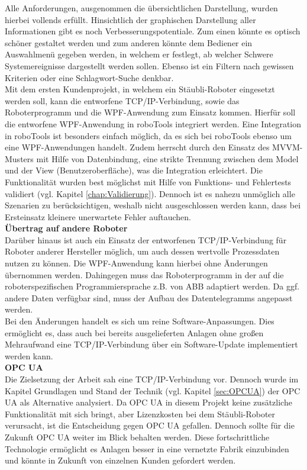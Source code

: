 \documentclass[ a4paper,
                oneside,
                toc=bibliography,
                toc=listof
                ]{scrbook}
\begin{document}
   	\noindent
   	Alle Anforderungen, ausgenommen die übersichtlichen Darstellung, wurden hierbei vollends erfüllt. Hinsichtlich der graphischen Darstellung aller Informationen gibt es noch Verbesserungspotentiale. Zum einen könnte es optisch schöner gestaltet werden und zum anderen könnte dem Bediener ein Auswahlmenü gegeben werden, in welchem er festlegt, ab welcher Schwere Systemereignisse dargestellt werden sollen. Ebenso ist ein Filtern nach gewissen Kriterien oder eine Schlagwort-Suche denkbar.\\
   	Mit dem ersten Kundenprojekt, in welchem ein Stäubli-Roboter eingesetzt werden soll, kann die entworfene TCP/IP-Verbindung, sowie das Roboterprogramm und die WPF-Anwendung zum Einsatz kommen. Hierfür soll die entworfene WPF-Anwendung in roboTools integriert werden. Eine Integration in roboTools ist besonders einfach möglich, da es sich bei roboTools ebenso um eine WPF-Anwendungen handelt. Zudem herrscht durch den Einsatz des MVVM-Musters mit Hilfe von Datenbindung, eine strikte Trennung zwischen dem Model und der View (Benutzeroberfläche), was die Integration erleichtert.
   	Die Funktionalität wurden best möglichst mit Hilfe von Funktions- und Fehlertests validiert (vgl. Kapitel \ref{chap:Validierung}). Dennoch ist es nahezu unmöglich alle Szenarien zu berücksichtigen, weshalb nicht ausgeschlossen werden kann, dass bei Ersteinsatz kleinere unerwartete Fehler auftauchen.\vspace{0.5\baselineskip}\\
   	\textbf{Übertrag auf andere Roboter}\\
   	Darüber hinaus ist auch ein Einsatz der entworfenen TCP/IP-Verbindung für Roboter anderer Hersteller möglich, um auch dessen wertvolle Prozessdaten nutzen zu können. Die WPF-Anwendung kann hierbei ohne Änderungen übernommen werden. Dahingegen muss das Roboterprogramm in der auf die roboterspezifischen Programmiersprache z.B. von ABB adaptiert werden. Da ggf. andere Daten verfügbar sind, muss der Aufbau des Datentelegramms angepasst werden.\\
   	Bei den Änderungen handelt es sich um reine Software-Anpassungen. Dies ermöglicht es, dass auch bei bereits ausgelieferten Anlagen ohne großen Mehraufwand eine TCP/IP-Verbindung über ein Software-Update implementiert werden kann.\vspace{0.5\baselineskip}\\
   	\textbf{OPC UA}\\
   	Die Zielsetzung der Arbeit sah eine TCP/IP-Verbindung vor. Dennoch wurde im Kapitel Grundlagen und Stand der Technik (vgl. Kapitel \ref{sec:OPCUA}) der OPC UA als Alternative analysiert. Da OPC UA in diesem Projekt keine zusätzliche Funktionalität mit sich bringt, aber Lizenzkosten bei dem Stäubli-Roboter verursacht, ist die Entscheidung gegen OPC UA gefallen. Dennoch sollte für die Zukunft OPC UA weiter im Blick behalten werden. Diese fortschrittliche Technologie ermöglicht es Anlagen besser in eine vernetzte Fabrik einzubinden und könnte in Zukunft von einzelnen Kunden gefordert werden. \vspace{0.5\baselineskip}\\
\end{document}
